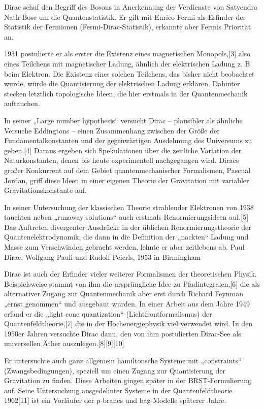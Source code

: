 Dirac schuf den Begriff des Bosons in Anerkennung der Verdienste von Satyendra Nath Bose um die Quantenstatistik. Er gilt mit Enrico Fermi als Erfinder der Statistik der Fermionen (Fermi-Dirac-Statistik), erkannte aber Fermis Priorität an.

1931 postulierte er als erster die Existenz eines magnetischen Monopols,[3] also eines Teilchens mit magnetischer Ladung, ähnlich der elektrischen Ladung z. B. beim Elektron. Die Existenz eines solchen Teilchens, das bisher nicht beobachtet wurde, würde die Quantisierung der elektrischen Ladung erklären. Dahinter stecken letztlich topologische Ideen, die hier erstmals in der Quantenmechanik auftauchen.

In seiner „Large number hypothesis“ versucht Dirac – plausibler als ähnliche Versuche Eddingtons – einen Zusammenhang zwischen der Größe der Fundamentalkonstanten und der gegenwärtigen Ausdehnung des Universums zu geben.[4] Daraus ergeben sich Spekulationen über die zeitliche Variation der Naturkonstanten, denen bis heute experimentell nachgegangen wird. Diracs großer Konkurrent auf dem Gebiet quantenmechanischer Formalismen, Pascual Jordan, griff diese Ideen in einer eigenen Theorie der Gravitation mit variabler Gravitationskonstante auf.

In seiner Untersuchung der klassischen Theorie strahlender Elektronen von 1938 tauchten neben „runaway solutions“ auch erstmals Renormierungsideen auf.[5] Das Auftreten divergenter Ausdrücke in der üblichen Renormierungstheorie der Quantenelektrodynamik, die dann in die Definition der „nackten“ Ladung und Masse zum Verschwinden gebracht werden, lehnte er aber zeitlebens ab.
Paul Dirac, Wolfgang Pauli und Rudolf Peierls, 1953 in Birmingham

Dirac ist auch der Erfinder vieler weiterer Formalismen der theoretischen Physik. Beispielsweise stammt von ihm die ursprüngliche Idee zu Pfadintegralen,[6] die als alternativer Zugang zur Quantenmechanik aber erst durch Richard Feynman „ernst genommen“ und ausgebaut wurden. In einer Arbeit aus dem Jahre 1949 erfand er die „light cone quantization“ (Lichtfrontformalismus) der Quantenfeldtheorie,[7] die in der Hochenergiephysik viel verwendet wird. In den 1950er Jahren versuchte Dirac dann, den von ihm postulierten Dirac-See als universellen Äther auszulegen.[8][9][10]

Er untersuchte auch ganz allgemein hamiltonsche Systeme mit „constraints“ (Zwangsbedingungen), speziell um einen Zugang zur Quantisierung der Gravitation zu finden. Diese Arbeiten gingen später in der BRST-Formulierung auf. Seine Untersuchung ausgedehnter Systeme in der Quantenfeldtheorie 1962[11] ist ein Vorläufer der p-branes und bag-Modelle späterer Jahre. 
